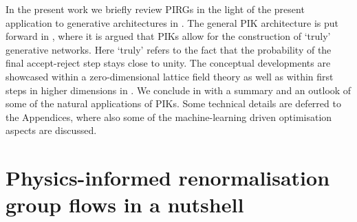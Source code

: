 \documentclass[reprint,amsmath,amssymb,aps,pra,superscriptaddress,nofootinbib,twocolumn,floatfix,nolongbibliography]{revtex4-2}
\begin{document}
In the present work we briefly review PIRGs in the light of the present application to generative architectures in . The  general PIK architecture is put forward in , where it is argued that PIKs allow for the construction of `truly' generative networks. Here `truly' refers to the fact that the probability of the final accept-reject step stays close to unity. The conceptual developments are showcased within a zero-dimensional lattice field theory as well as within first steps in higher dimensions in . We conclude in  with a summary and an outlook of some of the natural applications of PIKs. Some technical details are deferred to the Appendices, where also some of the machine-learning driven optimisation aspects are discussed.   


\section{Physics-informed renormalisation group flows in a nutshell}
\label{sec:PIRGsNutshell}
\end{document}
